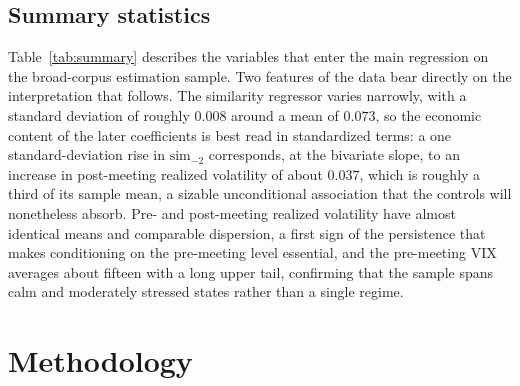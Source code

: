 \documentclass[11pt,a4paper]{article}
\begin{document}
\begin{table}[t]
\centering
\caption{Corpus coverage of the meeting-window similarity panel.}
\label{tab:coverage}
\small

\vspace{2pt}
\caption*{\footnotesize The broad GDELT panel has complete pre-meeting coverage at
a common lag for 33 meetings (2015--2019); the curated outlets cover more meetings
but sparsely at any given lag. Observation counts by lag are in the appendix.}
\end{table}

\subsection{Summary statistics}

Table~\ref{tab:summary} describes the variables that enter the main regression on
the broad-corpus estimation sample. Two features of the data bear directly on the
interpretation that follows. The similarity regressor varies narrowly, with a
standard deviation of roughly $0.008$ around a mean of $0.073$, so the economic
content of the later coefficients is best read in standardized terms: a one
standard-deviation rise in $\mathrm{sim}_{-2}$ corresponds, at the bivariate slope,
to an increase in post-meeting realized volatility of about $0.037$, which is
roughly a third of its sample mean, a sizable unconditional association that the
controls will nonetheless absorb. Pre- and post-meeting realized volatility have
almost identical means and comparable dispersion, a first sign of the persistence
that makes conditioning on the pre-meeting level essential, and the pre-meeting VIX
averages about fifteen with a long upper tail, confirming that the sample spans
calm and moderately stressed states rather than a single regime.

\begin{table}[t]
\centering
\caption{Summary statistics, broad-corpus estimation sample.}
\label{tab:summary}
\small

\vspace{2pt}
\caption*{\footnotesize The 33 GDELT meetings with complete pre-meeting coverage,
2015--2019. Realized volatility is annualized. Media tone is net sentiment per
thousand tokens in the pre-meeting window; the policy surprise is the orthogonalized
Bauer--Swanson series.}
\end{table}

\section{Methodology}
\label{sec:methods}
\end{document}
